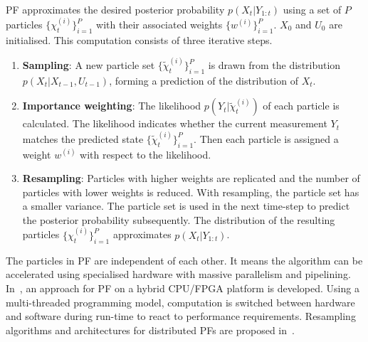PF approximates the desired posterior probability $p(X_{t}|Y_{1:t})$ using a set of $P$ particles $\{\chi^{(i)}_t\}^P_{i=1}$ with their associated weights $\{w^{(i)}\}^P_{i=1}$. 
$X_0$ and $U_0$ are initialised.
This computation consists of three iterative steps.

\begin{enumerate}
\item \textbf{Sampling}: A new particle set $\{\widetilde{\chi}^{(i)}_t\}^P_{i=1}$ is drawn from the distribution $p(X_t|X_{t-1},U_{t-1})$, forming a prediction of the distribution of $X_t$.
\item \textbf{Importance weighting}: The likelihood $p(Y_t|\widetilde{\chi}^{(i)}_t)$ of each particle is calculated. 
The likelihood indicates whether the current measurement $Y_t$ matches the predicted state $\{\widetilde{\chi}^{(i)}_t\}^P_{i=1}$. 
Then each particle is assigned a weight $w^{(i)}$ with respect to the likelihood.
\item \textbf{Resampling}: Particles with higher weights are replicated and the number of particles with lower weights is reduced. 
With resampling, the particle set has a smaller variance. 
The particle set is used in the next time-step to predict the posterior probability subsequently. 
The distribution of the resulting particles $\{\chi^{(i)}_t\}^P_{i=1}$ approximates $p(X_t|Y_{1:t})$.
\end{enumerate}

The particles in PF are independent of each other.
It means the algorithm can be accelerated using specialised hardware with massive parallelism and pipelining.
In~\cite{happe11}, an approach for PF on a hybrid CPU/FPGA platform is developed.
Using a multi-threaded programming model, computation is switched between hardware and software during run-time to react to performance requirements. 
Resampling algorithms and architectures for distributed PFs are proposed in~\cite{bolic05}.

